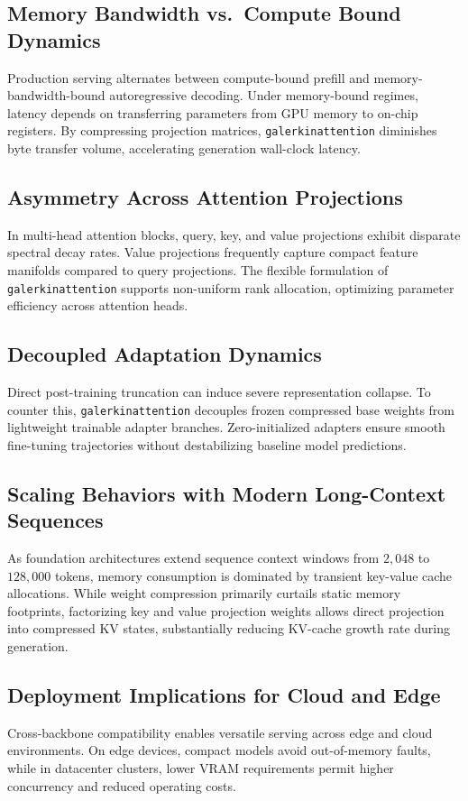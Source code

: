 \subsection{Memory Bandwidth vs.\ Compute Bound Dynamics}
Production serving alternates between compute-bound prefill and memory-bandwidth-bound autoregressive decoding. Under memory-bound regimes, latency depends on transferring parameters from GPU memory to on-chip registers. By compressing projection matrices, \texttt{galerkinattention} diminishes byte transfer volume, accelerating generation wall-clock latency.

\subsection{Asymmetry Across Attention Projections}
In multi-head attention blocks, query, key, and value projections exhibit disparate spectral decay rates. Value projections frequently capture compact feature manifolds compared to query projections. The flexible formulation of \texttt{galerkinattention} supports non-uniform rank allocation, optimizing parameter efficiency across attention heads.

\subsection{Decoupled Adaptation Dynamics}
Direct post-training truncation can induce severe representation collapse. To counter this, \texttt{galerkinattention} decouples frozen compressed base weights from lightweight trainable adapter branches. Zero-initialized adapters ensure smooth fine-tuning trajectories without destabilizing baseline model predictions.

\subsection{Scaling Behaviors with Modern Long-Context Sequences}
As foundation architectures extend sequence context windows from $2{,}048$ to $128{,}000$ tokens, memory consumption is dominated by transient key-value cache allocations. While weight compression primarily curtails static memory footprints, factorizing key and value projection weights allows direct projection into compressed KV states, substantially reducing KV-cache growth rate during generation.

\subsection{Deployment Implications for Cloud and Edge}
Cross-backbone compatibility enables versatile serving across edge and cloud environments. On edge devices, compact models avoid out-of-memory faults, while in datacenter clusters, lower VRAM requirements permit higher concurrency and reduced operating costs.

